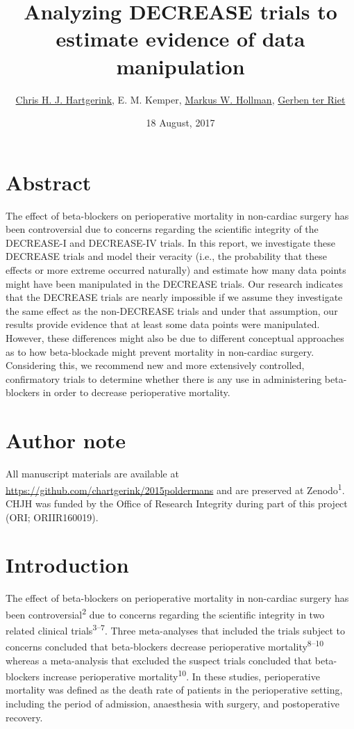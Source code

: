 \documentclass[]{article}
\title{Analyzing DECREASE trials to estimate evidence of data manipulation}
\author{\href{https://orcid.org/0000-0003-1050-6809}{Chris H. J. Hartgerink}, E.
M. Kemper, \href{https://orcid.org/0000-0001-8248-0244}{Markus W.
Hollman}, \href{https://orcid.org/0000-0002-2231-7637}{Gerben ter Riet}}
\date{18 August, 2017}
\begin{document}
\maketitle

\section{Abstract}\label{abstract}

The effect of beta-blockers on perioperative mortality in non-cardiac
surgery has been controversial due to concerns regarding the scientific
integrity of the DECREASE-I and DECREASE-IV trials. In this report, we
investigate these DECREASE trials and model their veracity (i.e., the
probability that these effects or more extreme occurred naturally) and
estimate how many data points might have been manipulated in the
DECREASE trials. Our research indicates that the DECREASE trials are
nearly impossible if we assume they investigate the same effect as the
non-DECREASE trials and under that assumption, our results provide
evidence that at least some data points were manipulated. However, these
differences might also be due to different conceptual approaches as to
how beta-blockade might prevent mortality in non-cardiac surgery.
Considering this, we recommend new and more extensively controlled,
confirmatory trials to determine whether there is any use in
administering beta-blockers in order to decrease perioperative
mortality.

\section{Author note}\label{author-note}

All manuscript materials are available at
\url{https://github.com/chartgerink/2015poldermans} and are preserved at
Zenodo\textsuperscript{1}. CHJH was funded by the Office of Research
Integrity during part of this project (ORI; ORIIR160019).

\section{Introduction}\label{introduction}

The effect of beta-blockers on perioperative mortality in non-cardiac
surgery has been controversial\textsuperscript{2} due to concerns
regarding the scientific integrity in two related clinical
trials\textsuperscript{3--7}. Three meta-analyses that included the
trials subject to concerns concluded that beta-blockers decrease
perioperative mortality\textsuperscript{8--10} whereas a meta-analysis
that excluded the suspect trials concluded that beta-blockers increase
perioperative mortality\textsuperscript{10}. In these studies,
perioperative mortality was defined as the death rate of patients in the
perioperative setting, including the period of admission, anaesthesia
with surgery, and postoperative recovery.
\end{document}
